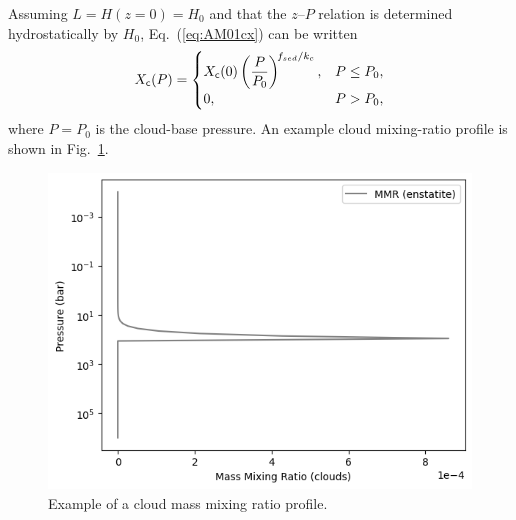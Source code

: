 Assuming $L=H(z{=}0)=H_0$ and that the $z$–$P$ relation is determined hydrostatically by $H_0$, Eq.~(\ref{eq:AM01cx}) can be written
\begin{align}
X_{\mathsf{c}}(P) = 
\begin{cases}
X_{\mathsf{c}}(0) \left( \dfrac{P}{P_0} \right)^{\! f_{sed}/k_c}, & P \le P_0, \\[4pt]
0, & P > P_0,
\end{cases}
\end{align}
where $P=P_0$ is the cloud-base pressure.  
An example cloud mixing-ratio profile is shown in Fig.~\ref{fig:vmrcloud}.

\begin{figure}[htb]
\begin{center}
\includegraphics[width=\linewidth]{fig/clouds/mmrcloud.png}
\caption{Example of a cloud mass mixing ratio profile.\label{fig:vmrcloud}}
\end{center}
\end{figure}

